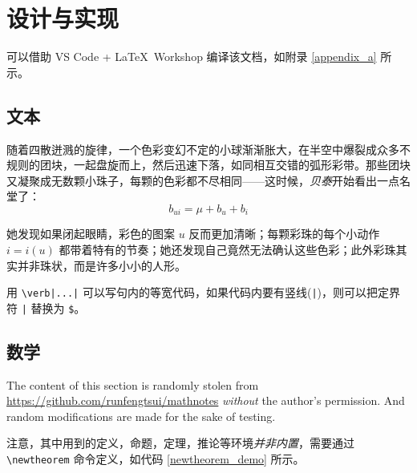 \documentclass[12]{ctexart}
\begin{document}




\section{设计与实现}

可以借助 VS Code + \LaTeX\ Workshop 编译该文档，如附录 \ref{appendix_a} 所示。

\subsection{文本}
 
随着四散迸溅的旋律，一个色彩变幻不定的小球渐渐胀大，在半空中爆裂成众多不规则的团块\cite{sklearn}，一起盘旋而上，然后迅速下落，如同相互交错的弧形彩带\cite{movielens}。那些团块又凝聚成无数颗小珠子，每颗的色彩都不尽相同——这时候，\emph{贝泰}开始看出一点名堂了：
\begin{equation}
    b_{ui} = \mu+b_u+b_i
\end{equation}

她发现如果闭起眼睛，彩色的图案 $u$ 反而更加清晰\cite{surprise}；每颗彩珠的每个小动作 $i=i(u)$ 都带着特有的节奏；她还发现自己竟然无法确认这些色彩；此外彩珠其实并非珠状，而是许多小小的人形。 

用 \verb$\verb|...|$ 可以写句内的等宽代码，如果代码内要有竖线(\verb$|$)，则可以把定界符 \verb$|$ 替换为 \verb|$|。

\subsection{数学}

The content of this section is randomly  stolen from \url{https://github.com/runfengtsui/mathnotes} \emph{without} the author's permission. And random modifications are made for the sake of testing.

注意，其中用到的定义，命题，定理，推论等环境\emph{并非内置}，需要通过 \verb$\newtheorem$ 命令定义，如代码 \ref{newtheorem_demo} 所示。
\end{document}
